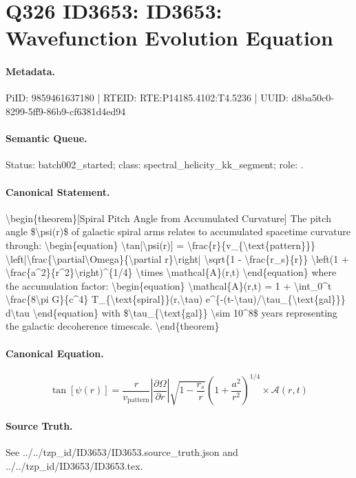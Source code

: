 \section*{Q326 ID3653: ID3653: Wavefunction Evolution Equation}
\paragraph{Metadata.}
PiID: 9859461637180 | RTEID: RTE:P14185.4102:T4.5236 | UUID: d8ba50c0-8299-5ff9-86b9-cf6381d4ed94

\paragraph{Semantic Queue.}
Status: batch002\_started; class: spectral\_helicity\_kk\_segment; role: .

\paragraph{Canonical Statement.}
\textbackslash{}begin\{theorem\}[Spiral Pitch Angle from Accumulated Curvature] The pitch angle \$\textbackslash{}psi(r)\$ of galactic spiral arms relates to accumulated spacetime curvature through: \textbackslash{}begin\{equation\} \textbackslash{}tan[\textbackslash{}psi(r)] = \textbackslash{}frac\{r\}\{v\_\{\textbackslash{}text\{pattern\}\}\} \textbackslash{}left|\textbackslash{}frac\{\textbackslash{}partial\textbackslash{}Omega\}\{\textbackslash{}partial r\}\textbackslash{}right| \textbackslash{}sqrt\{1 - \textbackslash{}frac\{r\_s\}\{r\}\} \textbackslash{}left(1 + \textbackslash{}frac\{a\textasciicircum{}2\}\{r\textasciicircum{}2\}\textbackslash{}right)\textasciicircum{}\{1/4\} \textbackslash{}times \textbackslash{}mathcal\{A\}(r,t) \textbackslash{}end\{equation\} where the accumulation factor: \textbackslash{}begin\{equation\} \textbackslash{}mathcal\{A\}(r,t) = 1 + \textbackslash{}int\_0\textasciicircum{}t \textbackslash{}frac\{8\textbackslash{}pi G\}\{c\textasciicircum{}4\} T\_\{\textbackslash{}text\{spiral\}\}(r,\textbackslash{}tau) e\textasciicircum{}\{-(t-\textbackslash{}tau)/\textbackslash{}tau\_\{\textbackslash{}text\{gal\}\}\} d\textbackslash{}tau \textbackslash{}end\{equation\} with \$\textbackslash{}tau\_\{\textbackslash{}text\{gal\}\} \textbackslash{}sim 10\textasciicircum{}8\$ years representing the galactic decoherence timescale. \textbackslash{}end\{theorem\}

\paragraph{Canonical Equation.}
\[
\begin{equation} \tan[\psi(r)] = \frac{r}{v_{\text{pattern}}} \left|\frac{\partial\Omega}{\partial r}\right| \sqrt{1 - \frac{r_s}{r}} \left(1 + \frac{a^2}{r^2}\right)^{1/4} \times \mathcal{A}(r,t) \end{equation}
\]

\paragraph{Source Truth.}
See ../../tzp\_id/ID3653/ID3653.source\_truth.json and ../../tzp\_id/ID3653/ID3653.tex.
